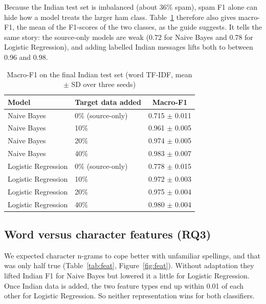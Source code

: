 Because the Indian test set is imbalanced (about 36\% spam), spam F1 alone can hide how a model treats the larger ham class. Table~\ref{tab:macro} therefore also gives macro-F1, the mean of the F1-scores of the two classes, as the guide suggests. It tells the same story: the source-only models are weak (0.72 for Naive Bayes and 0.78 for Logistic Regression), and adding labelled Indian messages lifts both to between 0.96 and 0.98.

\begin{table}[H]
\centering
\caption{Macro-F1 on the final Indian test set (word TF-IDF, mean $\pm$ SD over three seeds)}
\label{tab:macro}
\begin{tabular}{|l|l|c|}
\hline
\textbf{Model} & \textbf{Target data added} & \textbf{Macro-F1} \\
\hline
Naive Bayes & 0\% (source-only) & 0.715 $\pm$ 0.011 \\
\hline
Naive Bayes & 10\% & 0.961 $\pm$ 0.005 \\
\hline
Naive Bayes & 20\% & 0.974 $\pm$ 0.005 \\
\hline
Naive Bayes & 40\% & 0.983 $\pm$ 0.007 \\
\hline
Logistic Regression & 0\% (source-only) & 0.778 $\pm$ 0.015 \\
\hline
Logistic Regression & 10\% & 0.972 $\pm$ 0.003 \\
\hline
Logistic Regression & 20\% & 0.975 $\pm$ 0.004 \\
\hline
Logistic Regression & 40\% & 0.980 $\pm$ 0.004 \\
\hline
\end{tabular}
\end{table}

\subsection{Word versus character features (RQ3)}
We expected character n-grams to cope better with unfamiliar spellings, and that was only half true (Table~\ref{tab:feat}, Figure~\ref{fig:feat}). Without adaptation they lifted Indian F1 for Naive Bayes but lowered it a little for Logistic Regression. Once Indian data is added, the two feature types end up within 0.01 of each other for Logistic Regression. So neither representation wins for both classifiers.

